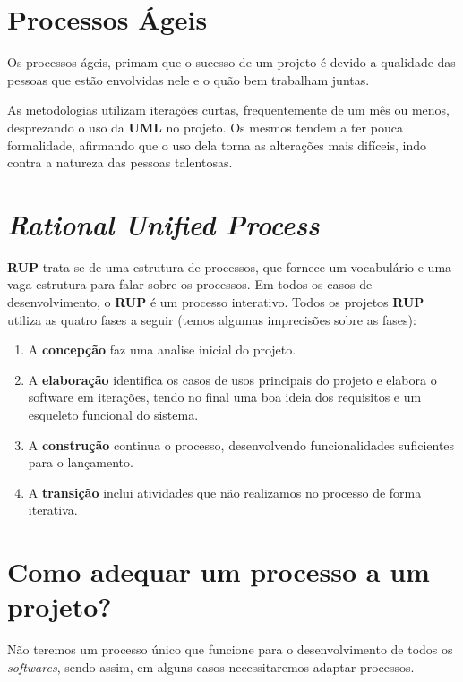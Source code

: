 \documentclass[a4paper, 12pt]{report}
\begin{document}
	\section{Processos Ágeis}
	
	Os processos ágeis, primam que o sucesso de um projeto é devido a qualidade das pessoas que estão envolvidas nele e o quão bem trabalham juntas.
	
	As metodologias utilizam iterações curtas, frequentemente de um mês ou menos, desprezando o uso da \textbf{UML} no projeto. Os mesmos tendem a ter pouca formalidade, afirmando que o uso dela torna as alterações mais difíceis, indo contra a natureza das pessoas talentosas.
	
	
	\section{\textit{Rational Unified Process}}
	
	\textbf{RUP} trata-se de uma estrutura de processos, que fornece um vocabulário e uma vaga estrutura para falar sobre os processos. Em todos os casos de desenvolvimento, o \textbf{RUP} é um processo interativo. Todos os projetos \textbf{RUP} utiliza as quatro fases a seguir (temos algumas imprecisões sobre as fases):
	
	\begin{enumerate}
		\item A \textbf{concepção} faz uma analise inicial do projeto.
		
		\item A \textbf{elaboração} identifica os casos de usos principais do projeto e elabora o software em iterações, tendo no final uma boa ideia dos requisitos e um esqueleto funcional do sistema.
	
		\item A \textbf{construção} continua o processo, desenvolvendo funcionalidades suficientes para o lançamento.
		
		\item A \textbf{transição} inclui atividades que não realizamos no processo de forma iterativa.
	\end{enumerate}
	
	
	\section{Como adequar um processo a um projeto?}
	
	Não teremos um processo único que funcione para o desenvolvimento de todos os \textit{softwares}, sendo assim, em alguns casos necessitaremos adaptar processos.
	
\end{document}
